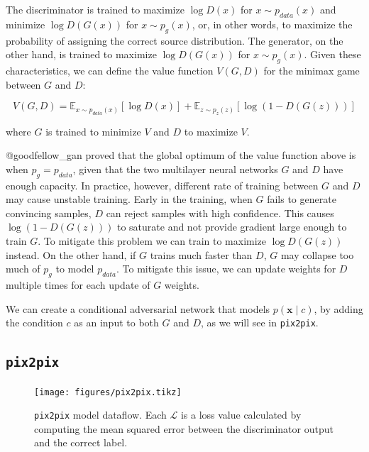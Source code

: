 \documentclass[]{report}
\begin{document}
The discriminator is trained to maximize \(\log D(x)\) for
\(x \sim p_{data}(x)\) and minimize \(\log D(G(x))\) for
\(x \sim p_g(x)\), or, in other words, to maximize the probability of
assigning the correct source distribution. The generator, on the other
hand, is trained to maximize \(\log D(G(x))\) for \(x \sim p_g(x)\).
Given these characteristics, we can define the value function
\(V(G, D)\) for the minimax game between \(G\) and \(D\):

\begin{equation}
    V(G, D) = \mathbb{E}_{x \sim p_{data}(x)}[\log D(x)] + \mathbb{E}_{z \sim p_{z}(z)}[\log (1 - D(G(z)))] \label{eq:gan}
\end{equation}

where \(G\) is trained to minimize \(V\) and \(D\) to maximize \(V\).

@goodfellow\_gan proved that the global optimum of the value function
above is when \(p_g = p_{data}\), given that the two multilayer neural
networks \(G\) and \(D\) have enough capacity. In practice, however,
different rate of training between \(G\) and \(D\) may cause unstable
training. Early in the training, when \(G\) fails to generate convincing
samples, \(D\) can reject samples with high confidence. This causes
\(\log (1 - D(G(z)))\) to saturate and not provide gradient large enough
to train \(G\). To mitigate this problem we can train to maximize
\(\log D(G(z))\) instead. On the other hand, if \(G\) trains much faster
than \(D\), \(G\) may collapse too much of \(p_g\) to model
\(p_{data}\). To mitigate this issue, we can update weights for \(D\)
multiple times for each update of \(G\) weights.

We can create a conditional adversarial network that models
\(p(\mathbf{x} \mid c)\), by adding the condition \(c\) as an input to
both \(G\) and \(D\), as we will see in \texttt{pix2pix}.

\hypertarget{pix2pix}{%
\subsection{\texorpdfstring{\texttt{pix2pix}}{pix2pix}}\label{pix2pix}}

\begin{figure}[h]
    \texttt{[image: figures/pix2pix.tikz]}
\centering
\caption{\texttt{pix2pix} model dataflow. Each $\mathcal{L}$ is a loss value calculated by computing the mean squared error between the discriminator output and the correct label. \label{fig:pix2pix}}
\end{figure}
\end{document}
